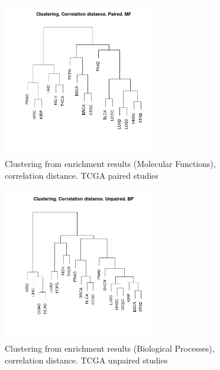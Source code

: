 \documentclass[a4paper,12pt]{article}
\begin{document}
\begin{figure}[!h] 
\centering 
\includegraphics[width=0.6\textwidth]{img/cluster_corelationd_mf_paired.png} 
\caption{Clustering from enrichment results (Molecular Functions), correlation distance.  TCGA paired studies} 
\label{figCLUST_corr_mf_paired} 
\end{figure} 



\begin{figure}[!h] 
\centering 
\includegraphics[width=0.6\textwidth]{img/cluster_corelationd_bp_unpaired.png} 
\caption{Clustering from enrichment results (Biological Processes), correlation distance.  TCGA unpaired studies} 
\label{figCLUST_corr_bp_unpaired} 
\end{figure} 
\end{document}
